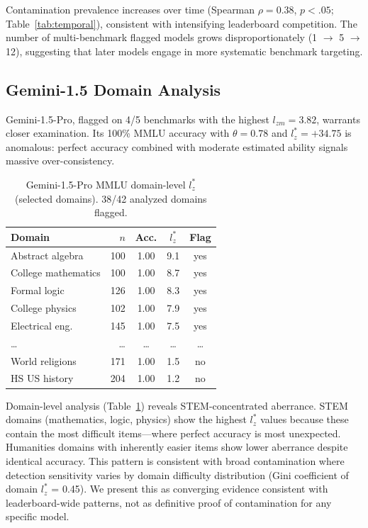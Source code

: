 \documentclass[11pt,a4paper]{article}
\begin{document}
Contamination prevalence increases over time (Spearman $\rho=0.38$, $p<.05$; Table~\ref{tab:temporal}), consistent with intensifying leaderboard competition.
The number of multi-benchmark flagged models grows disproportionately (1 $\to$ 5 $\to$ 12), suggesting that later models engage in more systematic benchmark targeting.

\subsection{Gemini-1.5 Domain Analysis}

Gemini-1.5-Pro, flagged on 4/5 benchmarks with the highest $l_{zm}=3.82$, warrants closer examination.
Its 100\% MMLU accuracy with $\theta=0.78$ and $l_{z}^{*}=+34.75$ is anomalous: perfect accuracy combined with moderate estimated ability signals massive over-consistency.

\begin{table}[t]
\centering
\caption{Gemini-1.5-Pro MMLU domain-level $l_{z}^{*}$ (selected domains). 38/42 analyzed domains flagged.}
\label{tab:gemini-domain}
\small
\begin{tabular}{lrccc}
\toprule
\textbf{Domain} & $n$ & \textbf{Acc.} & $l_{z}^{*}$ & \textbf{Flag} \\
\midrule
Abstract algebra      & 100 & 1.00 & 9.1 & yes \\
College mathematics   & 100 & 1.00 & 8.7 & yes \\
Formal logic          & 126 & 1.00 & 8.3 & yes \\
College physics       & 102 & 1.00 & 7.9 & yes \\
Electrical eng.       & 145 & 1.00 & 7.5 & yes \\
\ldots & \ldots & \ldots & \ldots & \ldots \\
World religions       & 171 & 1.00 & 1.5 & no \\
HS US history         & 204 & 1.00 & 1.2 & no \\
\bottomrule
\end{tabular}
\end{table}

Domain-level analysis (Table~\ref{tab:gemini-domain}) reveals STEM-concentrated aberrance.
STEM domains (mathematics, logic, physics) show the highest $l_{z}^{*}$ values because these contain the most difficult items---where perfect accuracy is most unexpected.
Humanities domains with inherently easier items show lower aberrance despite identical accuracy.
This pattern is consistent with broad contamination where detection sensitivity varies by domain difficulty distribution (Gini coefficient of domain $l_{z}^{*}$ = 0.45).
We present this as converging evidence consistent with leaderboard-wide patterns, not as definitive proof of contamination for any specific model.
\end{document}

